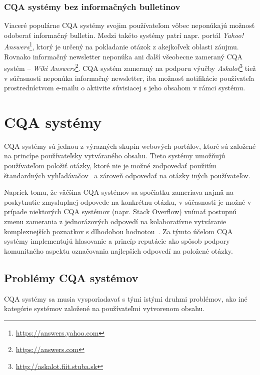 \subsection{CQA systémy bez informačných bulletinov}

Viaceré populárne CQA systémy svojim používateľom vôbec neponúkajú možnosť odoberať informačný bulletin. Medzi takéto
systémy patrí napr. portál \emph{Yahoo! Answers}\footnote{\url{https://answers.yahoo.com}}, ktorý je určený na pokladanie
otázok z akejkoľvek oblasti záujmu. Rovnako informačný newsletter neponúka ani ďalší všeobecne zameraný CQA systém --
\emph{Wiki Answers}\footnote{\url{https://answers.com}}. CQA systém zameraný na podporu výučby
\emph{Askalot}\footnote{\url{http://askalot.fiit.stuba.sk}} tiež v súčasnosti neponúka informačný newsletter,
iba možnosť notifikácie používateľa prostredníctvom e-mailu o aktivite súvisiacej s jeho obsahom v rámci systému.





\newpage
\chapter{CQA systémy}

CQA systémy sú jednou z výrazných skupín webových portálov, ktoré sú založené na princípe používateľsky vytváraného obsahu.
Tieto systémy umožňujú používateľom položiť otázky, ktoré nie je možné zodpovedať použitím štandardných vyhľadávačov~\cite{Liu2012}
a zároveň odpovedať na otázky iných používateľov.

Napriek tomu, že väčšina CQA systémov sa spočiatku zameriava najmä na poskytnutie zmysluplnej odpovede na konkrétnu otázku,
v súčasnosti je možné v prípade niektorých CQA systémov (napr. Stack Overflow) vnímať postupnú zmenu zamerania
z jednorázových odpovedí na kolaboratívne vytváranie komplexnejších poznatkov s dlhodobou hodnotou~\cite{Anderson2012}.
Za týmto účelom CQA systémy implementujú hlasovanie a princíp reputácie ako spôsob podpory komunitného aspektu označovania
najlepších odpovedí na položené otázky.


\section{Problémy CQA systémov}

CQA systémy sa musia vysporiadavať s tými istými druhmi problémov, ako iné kategórie systémov založené na používateľmi
vytvorenom obsahu.

